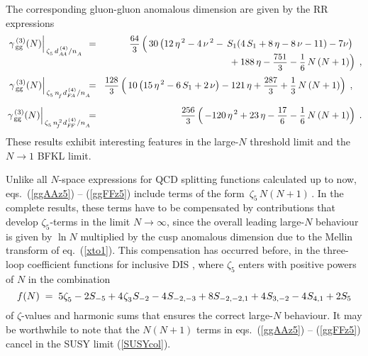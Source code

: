 \documentclass[12pt]{article}
\newcommand{\beq}{\begin{equation}}
\newcommand{\eeq}{\end{equation}}
\newcommand{\bea}{\begin{eqnarray}}
\newcommand{\eea}{\end{eqnarray}}
\newcommand{\nn}{\nonumber}
\newcommand{\ra}{\rightarrow}
\newcommand{\hspp}{{\hspace{5mm}}}
\def\frct#1#2{\mbox{\small{$\displaystyle\frac{#1}{#2}$}}}
\def\zr#1{{\zeta_{#1}^{}}}
\def\nf{{n^{}_{\! f}}}
\def\nfs{{n^{\,2}_{\! f}}}
\def\etaD#1{\eta^{\,#1}}
\def\nuD#1{\nu^{\,#1}}
\def\S(#1){{{S}_{#1}}}
\def\Ss(#1,#2){{{S}_{#1,#2}}}
\def\Sss(#1,#2,#3){{{S}_{#1,#2,#3}}}
\begin{document}
The corresponding gluon-gluon anomalous dimension are given by the RR 
expressions
%
\bea
\label{ggAAz5}
  \left. \gamma_{\,\rm gg}^{\,(3)}(N)
  \right|_{\,\zr5\,d^{\,(4)}_{A\!A}/n_A^{}} \;\;
  &\!=\!&
 \frct{64}{3} \* \left(\, 
    30 \* \left( 12 \,\* \etaD2 - 4 \,\* \nuD2 
       - \,\* \S(1) \* ( 4\,\*\S(1) + 8 \,\* \eta - 8\,\* \nu - 11 ) 
       - 7 \* \nu \right) 
\phantom{\frct{1}{2}} \right.  \nn \\[-2mm] & & \hspp \left. \mbox{}
       + 188 \,\* \eta - \frct{751}{3} - \frct{1}{6}\,\* N\,\*(N+1)
 \right)
\; , \\[1mm]
\label{ggFAz5}
  \left. \gamma_{\,\rm gg}^{\,(3)}(N)
  \right|_{\,\zr5\,\nf\:\! d^{\,(4)}_{F\!A}/n_A^{}} \!\!
  &\!=\!& 
 \frct{128}{3} \* \left(\, 
    10 \* \left( 15 \,\* \etaD2 - 6 \,\*\S(1) + 2 \,\*\nu \right)
    - 121 \,\* \eta + \frct{287}{3} + \frct{1}{3}\,\* N\,\*(N+1)
 \right)
\; , \quad \\[2mm]
\label{ggFFz5}
  \left. \gamma_{\,\rm gg}^{\,(3)}(N)
  \right|_{\,\zr5\,\nfs\:\! d^{\,(4)}_{F\!F}/n_A^{}} \!\!
  &\!=\!& 
 \frct{256}{3} \* \left(\, 
    - 120 \,\* \etaD2 + 23 \,\* \eta - \frct{17}{6} 
    - \frct{1}{6}\,\* N\,\*(N+1)
 \right)
\; .
\eea
%
These results exhibit interesting features in the large-$N$ threshold limit
and the $N \!\ra\! 1$ BFKL limit.


Unlike all $N$-space expressions for QCD splitting functions calculated up
to now, eqs.~(\ref{ggAAz5}) -- (\ref{ggFFz5}) include terms of the form
$\,\zr5\, N (N+1)\,$. In the complete results, these terms have to be 
compensated by contributions that develop $\zr5$-terms in the limit  
$N \!\ra\! \infty$, since the overall leading large-$N$ behaviour is given by
$\ln N$ multiplied by the cusp anomalous dimension \cite{Korch89} due to 
the Mellin transform of eq.~(\ref{xto1}). 
This compensation has occurred before, in the three-loop coefficient functions 
for inclusive DIS \cite{MVV610+}, where $\zr5$ enters with positive powers 
of $N$ in the combination
%
\beq
\label{fNfct}
     f(N) \;=\;
        5 \* \zr5
       - 2 \* \S(-5)
       + 4 \:\!\* \zr3 \:\!\* \S(-2) 
       - 4 \:\!\* \Ss(-2,-3)
       + 8 \* \Sss(-2,-2,1)
       + 4 \:\!\* \Ss(3,-2)
       - 4 \:\!\* \Ss(4,1)
       + 2 \* \S(5)
\eeq
%
of $\zeta$-values and harmonic sums \cite{HSums} that ensures the
correct large-$N$ behaviour. It may be worthwhile to note that the
$N (N+1)$ terms in eqs.~(\ref{ggAAz5}) -- (\ref{ggFFz5}) cancel in the
SUSY limit (\ref{SUSYcol}).
\end{document}
